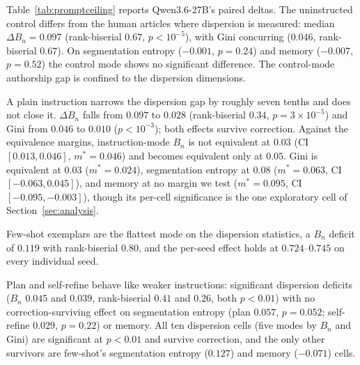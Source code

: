 \documentclass{article}
\begin{document}
Table~\ref{tab:promptceiling} reports Qwen3.6-27B's paired deltas. The uninstructed control differs from the human articles where dispersion is
measured: median $\Delta B_n = 0.097$ (rank-biserial $0.67$, $p<10^{-5}$), with Gini concurring
($0.046$, rank-biserial $0.67$). On segmentation entropy ($-0.001$, $p=0.24$) and memory ($-0.007$,
$p=0.52$) the control mode shows no significant difference. The control-mode authorship gap is
confined to the dispersion dimensions.

A plain instruction narrows the dispersion gap by roughly seven tenths and does not close it.
$\Delta B_n$ falls from $0.097$ to $0.028$ (rank-biserial $0.34$, $p=3\times10^{-5}$) and Gini from
$0.046$ to $0.010$ ($p<10^{-3}$); both effects survive correction. Against the
equivalence margins, instruction-mode $B_n$ is not equivalent at $0.03$ (CI $[0.013, 0.046]$,
$m^{*}=0.046$) and becomes equivalent only at $0.05$. Gini is equivalent at $0.03$ ($m^{*}=0.024$),
segmentation entropy at $0.08$ ($m^{*}=0.063$, CI $[-0.063, 0.045]$), and memory at no margin we
test ($m^{*}=0.095$, CI $[-0.095, -0.003]$), though its per-cell significance is the one
exploratory cell of Section~\ref{sec:analysis}.

Few-shot exemplars are the flattest mode on the dispersion statistics, a $B_n$ deficit of $0.119$
with rank-biserial $0.80$, and the per-seed effect holds at $0.724$--$0.745$ on every individual
seed.

Plan and self-refine behave like weaker instructions: significant dispersion deficits ($B_n$
$0.045$ and $0.039$, rank-biserial $0.41$ and $0.26$, both $p<0.01$) with no correction-surviving
effect on segmentation entropy (plan $0.057$, $p=0.052$; self-refine $0.029$, $p=0.22$) or memory.
All ten dispersion cells (five modes by $B_n$ and Gini) are significant at
$p<0.01$ and survive correction, and the only other survivors are few-shot's segmentation
entropy ($0.127$) and memory ($-0.071$) cells.
\end{document}
